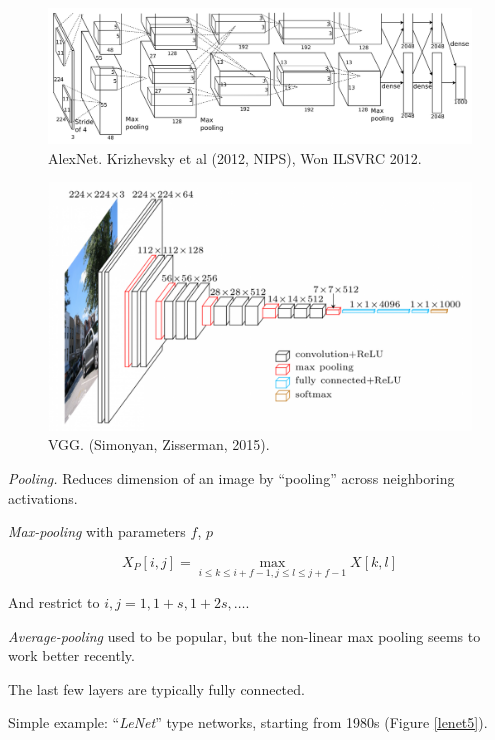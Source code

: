 \documentclass[english]{article}
\begin{document}
\begin{figure}
  \centering
  \includegraphics[scale=0.75]{a.png}
  \caption{AlexNet. Krizhevsky et al (2012, NIPS), Won ILSVRC 2012.}
  \label{AlexNet}
\end{figure}


\begin{figure}
  \centering
  \includegraphics[scale=0.3]{vgg.png}
    \caption{VGG. (Simonyan, Zisserman, 2015).}
    \label{VGG}
\end{figure}

\eenum 



\item \emph{Pooling.} Reduces dimension of an image by ``pooling'' across neighboring activations. 

\emph{Max-pooling} with parameters $f$, $p$

$$X_P[i,j]=\max_{i\le k \le  i+f-1 ,j \le l \le j+f-1} X[k,l]$$ 

And restrict to $i,j=1,1+s,1+2s,\ldots$.

\emph{Average-pooling} used to be popular, but the non-linear max pooling seems to work better recently. 

\item The last few layers are typically fully connected.

Simple example: ``\emph{LeNet}'' type networks, starting from 1980s (Figure \ref{lenet5}). 
\end{document}
